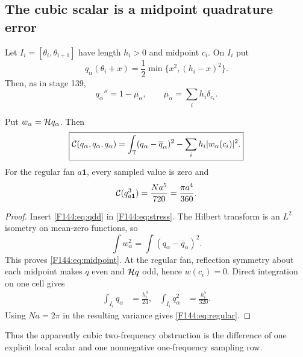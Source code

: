 \subsection{The cubic scalar is a midpoint quadrature error}

Let $I_i=[\theta_i,\theta_{i+1}]$ have length $h_i>0$ and midpoint
$c_i$.  On $I_i$ put
\begin{equation}\label{F144:eq:q}
 q_\alpha(\theta_i+x)=\frac12\min\{x^2,(h_i-x)^2\}.
\end{equation}
Then, as in stage 139,
\begin{equation}\label{F144:eq:qdd}
 q_\alpha''=1-\mu_\alpha,
 \qquad \mu_\alpha=\sum_i h_i\delta_{c_i}.
\end{equation}

\begin{theorem}
\label{F144:thm:midpoint}
Put $w_\alpha=\mathcal H q_\alpha$.  Then
\begin{equation}\label{F144:eq:midpoint}
 \boxed{
 \mathcal C(q_\alpha,q_\alpha,q_\alpha)
 =\int_\mathbb T(q_\alpha-\overline q_\alpha)^2
 -\sum_i h_i|w_\alpha(c_i)|^2.}
\end{equation}
For the regular fan $a\mathbf1$, every sampled value is zero and
\begin{equation}\label{F144:eq:regular}
 \mathcal C(q_{a\mathbf1}^3)=\frac{Na^5}{720}
 =\frac{\pi a^4}{360}.
\end{equation}
\end{theorem}

\begin{proof}
Insert \eqref{F144:eq:qdd} in \eqref{F144:eq:stress}.  The Hilbert transform is an
$L^2$ isometry on mean-zero functions, so
\begin{equation*}
 \int w_\alpha^2=\int(q_\alpha-\overline q_\alpha)^2.
\end{equation*}
This proves \eqref{F144:eq:midpoint}.  At the regular fan, reflection symmetry
about each midpoint makes $q$ even and $\mathcal H q$ odd, hence
$w(c_i)=0$.  Direct integration on one cell gives
\begin{align}
 \int_{I_i}q_\alpha&=\frac{h_i^3}{24},&
 \int_{I_i}q_\alpha^2&=\frac{h_i^5}{320}.
 \label{F144:eq:cell-integrals}
\end{align}
Using $Na=2\pi$ in the resulting variance gives \eqref{F144:eq:regular}.
\end{proof}

Thus the apparently cubic two-frequency obstruction is the difference of
one explicit local scalar and one nonnegative one-frequency sampling row.
\endgroup
